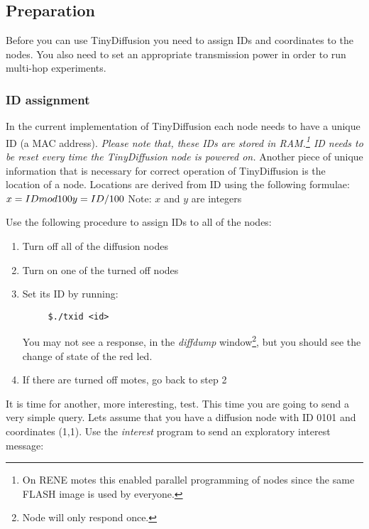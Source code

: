 \documentclass[11pt,onecolumn]{article}
\begin{document}
\subsection{Preparation}
Before you can use TinyDiffusion you need to assign IDs and
coordinates to the nodes. You also need to set an appropriate
transmission power in order to run multi-hop experiments.

\subsubsection{ID assignment}
\label{idassign}
In the current implementation of TinyDiffusion each node needs to have
a unique ID (a MAC address). \emph{Please note that, these IDs are
stored in RAM.\footnote{On RENE motes this enabled parallel programming
of nodes since the same FLASH image is used by everyone.} ID needs to
be reset every time the TinyDiffusion node is powered on.} Another piece
of unique information that is necessary for correct operation of
TinyDiffusion is the location of a node. Locations are derived from ID
using the following formulae:\\
\begin{math}
 x = ID mod 100\\
 y = ID / 100\\
\end{math}
Note: \(x\) and \(y\) are integers

Use the following procedure to assign IDs to all of the nodes:

\begin{enumerate}
	\item Turn off all of the diffusion nodes 
	\item Turn on one of the turned off nodes
	\item Set its ID by running:
	\begin{verbatim}
	 $./txid <id>
	\end{verbatim}
	You may not see a response, in the \emph{diffdump}
	window\footnote{Node will only respond once.}, but you should see
	the change of state of the red led.
	\item If there are turned off motes, go back to step 2
\end{enumerate}

It is time for another, more interesting, test. This time you are
going to send a very simple query. Lets assume that you have a
diffusion node with ID 0101 and coordinates (1,1). Use the
\emph{interest} program to send an exploratory interest message:
\end{document}
